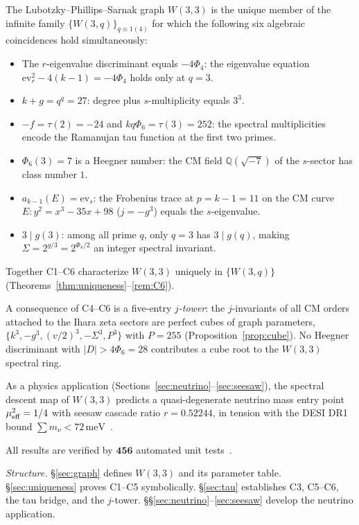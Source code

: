 \documentclass[12pt]{article}
\begin{document}
The Lubotzky--Phillips--Sarnak graph $W(3,3)$ is the unique member of the
infinite family $\{W(3,q)\}_{q\equiv 1(4)}$ for which the following six
algebraic coincidences hold simultaneously:
\begin{itemize}
\item[\textbf{C1.}] The $r$-eigenvalue discriminant equals $-4\Phi_4$:
  the eigenvalue equation $\mathrm{ev}_r^2-4(k-1)=-4\Phi_4$ holds only at $q=3$.
\item[\textbf{C2.}] $k+g = q^q=27$: degree plus $s$-multiplicity equals $3^3$.
\item[\textbf{C3.}] $-f=\tau(2)=-24$ and $kq\Phi_6=\tau(3)=252$:
  the spectral multiplicities encode the Ramanujan tau function at the first two primes.
\item[\textbf{C4.}] $\Phi_6(3)=7$ is a Heegner number:
  the CM field $\mathbb{Q}(\sqrt{-7})$ of the $s$-sector has class number $1$.
\item[\textbf{C5.}] $a_{k-1}(E)=\mathrm{ev}_s$: the Frobenius trace at $p=k-1=11$
  on the CM curve $E\colon y^2=x^3-35x+98$ ($j=-g^3$) equals the $s$-eigenvalue.
\item[\textbf{C6.}] $3\mid g(3)$: among all prime $q$, only $q=3$ has $3\mid g(q)$,
  making $\Sigma=2^{g/3}=2^{\Phi_4/2}$ an integer spectral invariant.
\end{itemize}
Together C1--C6 characterize $W(3,3)$ uniquely in $\{W(3,q)\}$
(Theorems~\ref{thm:uniqueness}--\ref{rem:C6}).

A consequence of C4--C6 is a five-entry \emph{$j$-tower}: the $j$-invariants
of all CM orders attached to the Ihara zeta sectors are perfect cubes of graph
parameters, $\{k^3,-g^3,(v/2)^3,-\Sigma^3,P^3\}$ with $P=255$
(Proposition~\ref{prop:cube}). No Heegner discriminant with $|D|>4\Phi_6=28$
contributes a cube root to the $W(3,3)$ spectral ring.

As a physics application (Sections~\ref{sec:neutrino}--\ref{sec:seesaw}),
the spectral descent map of $W(3,3)$ predicts a quasi-degenerate neutrino mass
entry point $\mu_{\rm eff}^2=1/4$ with seesaw cascade ratio $r=0.52244$,
in tension with the DESI DR1 bound $\sum m_\nu<72\,\mathrm{meV}$~\cite{DESI2024}.

All results are verified by $\mathbf{456}$ automated unit tests~\cite{Dahn2026repo}.

\medskip
\noindent\textit{Structure.}
\S\ref{sec:graph} defines $W(3,3)$ and its parameter table.
\S\ref{sec:uniqueness} proves C1--C5 symbolically.
\S\ref{sec:tau} establishes C3, C5--C6, the tau bridge, and the $j$-tower.
\S\S\ref{sec:neutrino}--\ref{sec:seesaw} develop the neutrino application.
\end{document}
